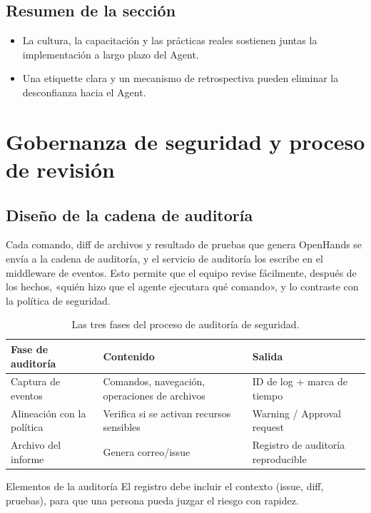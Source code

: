 \documentclass[a4paper]{article}
\begin{document}
\subsection{Resumen de la sección}
\begin{itemize}
    \item La cultura, la capacitación y las prácticas reales sostienen juntas la implementación a largo plazo del Agent.
    \item Una etiquette clara y un mecanismo de retrospectiva pueden eliminar la desconfianza hacia el Agent.
\end{itemize}

\section{Gobernanza de seguridad y proceso de revisión}
\subsection{Diseño de la cadena de auditoría}
Cada comando, diff de archivos y resultado de pruebas que genera OpenHands se envía a la cadena de auditoría, y el servicio de auditoría los escribe en el middleware de eventos. Esto permite que el equipo revise fácilmente, después de los hechos, «quién hizo que el agente ejecutara qué comando», y lo contraste con la política de seguridad.

\begin{table}[H]
\centering
\begin{tabular}{p{} p{} p{}}
\toprule
Fase de auditoría & Contenido & Salida \\
\midrule
Captura de eventos & Comandos, navegación, operaciones de archivos & ID de log + marca de tiempo \\
\midrule
Alineación con la política & Verifica si se activan recursos sensibles & Warning / Approval request \\
\midrule
Archivo del informe & Genera correo/issue & Registro de auditoría reproducible \\
\bottomrule
\end{tabular}
\caption{Las tres fases del proceso de auditoría de seguridad.}
\end{table}

\begin{importantbox}{Elementos de la auditoría}
El registro debe incluir el contexto (issue, diff, pruebas), para que una persona pueda juzgar el riesgo con rapidez.
\end{importantbox}
\end{document}
